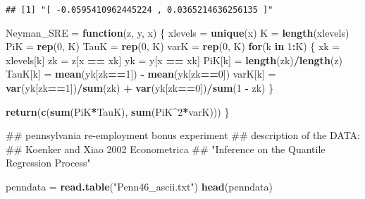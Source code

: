 \documentclass[]{article}
\newenvironment{Shaded}{\begin{snugshade}}{\end{snugshade}}
\newcommand{\KeywordTok}[1]{\textcolor[rgb]{0.13,0.29,0.53}{\textbf{#1}}}
\newcommand{\DecValTok}[1]{\textcolor[rgb]{0.00,0.00,0.81}{#1}}
\newcommand{\StringTok}[1]{\textcolor[rgb]{0.31,0.60,0.02}{#1}}
\newcommand{\ControlFlowTok}[1]{\textcolor[rgb]{0.13,0.29,0.53}{\textbf{#1}}}
\newcommand{\OperatorTok}[1]{\textcolor[rgb]{0.81,0.36,0.00}{\textbf{#1}}}
\newcommand{\NormalTok}[1]{#1}
\begin{document}
\begin{verbatim}
## [1] "[ -0.0595410962445224 , 0.0365214636256135 ]"
\end{verbatim}

\begin{Shaded}
\begin{Highlighting}[]
\NormalTok{Neyman_SRE =}\StringTok{ }\ControlFlowTok{function}\NormalTok{(z, y, x)}
\NormalTok{\{}
\NormalTok{       xlevels =}\StringTok{ }\KeywordTok{unique}\NormalTok{(x)}
\NormalTok{       K       =}\StringTok{ }\KeywordTok{length}\NormalTok{(xlevels)}
\NormalTok{       PiK     =}\StringTok{ }\KeywordTok{rep}\NormalTok{(}\DecValTok{0}\NormalTok{, K)}
\NormalTok{       TauK    =}\StringTok{ }\KeywordTok{rep}\NormalTok{(}\DecValTok{0}\NormalTok{, K)}
\NormalTok{       varK    =}\StringTok{ }\KeywordTok{rep}\NormalTok{(}\DecValTok{0}\NormalTok{, K)}
       \ControlFlowTok{for}\NormalTok{(k }\ControlFlowTok{in} \DecValTok{1}\OperatorTok{:}\NormalTok{K)}
\NormalTok{       \{}
\NormalTok{             xk         =}\StringTok{ }\NormalTok{xlevels[k]}
\NormalTok{             zk         =}\StringTok{ }\NormalTok{z[x }\OperatorTok{==}\StringTok{ }\NormalTok{xk]}
\NormalTok{             yk         =}\StringTok{ }\NormalTok{y[x }\OperatorTok{==}\StringTok{ }\NormalTok{xk]}
\NormalTok{             PiK[k]     =}\StringTok{ }\KeywordTok{length}\NormalTok{(zk)}\OperatorTok{/}\KeywordTok{length}\NormalTok{(z)}
\NormalTok{             TauK[k]    =}\StringTok{ }\KeywordTok{mean}\NormalTok{(yk[zk}\OperatorTok{==}\DecValTok{1}\NormalTok{]) }\OperatorTok{-}\StringTok{ }\KeywordTok{mean}\NormalTok{(yk[zk}\OperatorTok{==}\DecValTok{0}\NormalTok{])}
\NormalTok{             varK[k]    =}\StringTok{ }\KeywordTok{var}\NormalTok{(yk[zk}\OperatorTok{==}\DecValTok{1}\NormalTok{])}\OperatorTok{/}\KeywordTok{sum}\NormalTok{(zk) }\OperatorTok{+}\StringTok{ }
\StringTok{                               }\KeywordTok{var}\NormalTok{(yk[zk}\OperatorTok{==}\DecValTok{0}\NormalTok{])}\OperatorTok{/}\KeywordTok{sum}\NormalTok{(}\DecValTok{1} \OperatorTok{-}\StringTok{ }\NormalTok{zk)}
\NormalTok{       \}}
       
       \KeywordTok{return}\NormalTok{(}\KeywordTok{c}\NormalTok{(}\KeywordTok{sum}\NormalTok{(PiK}\OperatorTok{*}\NormalTok{TauK), }\KeywordTok{sum}\NormalTok{(PiK}\OperatorTok{^}\DecValTok{2}\OperatorTok{*}\NormalTok{varK)))}
\NormalTok{\}}

\NormalTok{## pennsylvania re-employment bonus experiment}
\NormalTok{## description of the DATA: }
\NormalTok{## Koenker and Xiao 2002 Econometrica }
\NormalTok{## "Inference on the Quantile Regression Process" }

\NormalTok{penndata =}\StringTok{ }\KeywordTok{read.table}\NormalTok{(}\StringTok{"Penn46_ascii.txt"}\NormalTok{)}
\KeywordTok{head}\NormalTok{(penndata)}
\end{Highlighting}
\end{Shaded}
\end{document}
